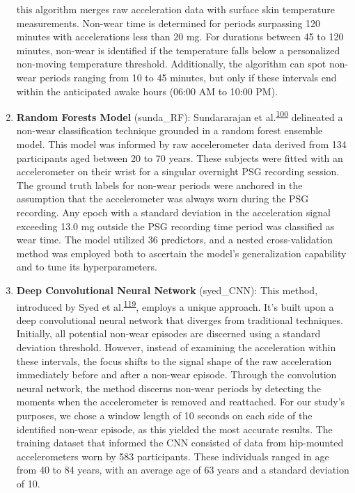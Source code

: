 \documentclass[
  10pt,
]{scrbook}
\let\originaltextbf\textbf
\renewcommand{\textbf}[1]{\textcolor{color1}{\textsf{\originaltextbf{#1}}}}
\begin{document}
\begin{enumerate}
  this algorithm merges raw acceleration data with surface skin
  temperature measurements. Non-wear time is determined for periods
  surpassing 120 minutes with accelerations less than 20 mg. For
  durations between 45 to 120 minutes, non-wear is identified if the
  temperature falls below a personalized non-moving temperature
  threshold. Additionally, the algorithm can spot non-wear periods
  ranging from 10 to 45 minutes, but only if these intervals end within
  the anticipated awake hours (06:00 AM to 10:00 PM).
\item
  \textsf{\textbf{Random Forests Model}} (\textsf{sunda\_RF}):
  Sundararajan et
  al.\textsuperscript{\protect\hyperlink{ref-sundararajan_sleep_2021}{100}}
  delineated a non-wear classification technique grounded in a random
  forest ensemble model. This model was informed by raw accelerometer
  data derived from 134 participants aged between 20 to 70 years. These
  subjects were fitted with an accelerometer on their wrist for a
  singular overnight PSG recording session. The ground truth labels for
  non-wear periods were anchored in the assumption that the
  accelerometer was always worn during the PSG recording. Any epoch with
  a standard deviation in the acceleration signal exceeding 13.0 mg
  outside the PSG recording time period was classified as wear time. The
  model utilized 36 predictors, and a nested cross-validation method was
  employed both to ascertain the model's generalization capability and
  to tune its hyperparameters.
\item
  \textsf{\textbf{Deep Convolutional Neural Network}}
  (\textsf{syed\_CNN}): This method, introduced by Syed et
  al.\textsuperscript{\protect\hyperlink{ref-syed_novel_2021}{119}},
  employs a unique approach. It's built upon a deep convolutional neural
  network that diverges from traditional techniques. Initially, all
  potential non-wear episodes are discerned using a standard deviation
  threshold. However, instead of examining the acceleration within these
  intervals, the focus shifts to the signal shape of the raw
  acceleration immediately before and after a non-wear episode. Through
  the convolution neural network, the method discerns non-wear periods
  by detecting the moments when the accelerometer is removed and
  reattached. For our study's purposes, we chose a window length of 10
  seconds on each side of the identified non-wear episode, as this
  yielded the most accurate results. The training dataset that informed
  the CNN consisted of data from hip-mounted accelerometers worn by 583
  participants. These individuals ranged in age from 40 to 84 years,
  with an average age of 63 years and a standard deviation of 10.
\end{enumerate}
\end{document}
